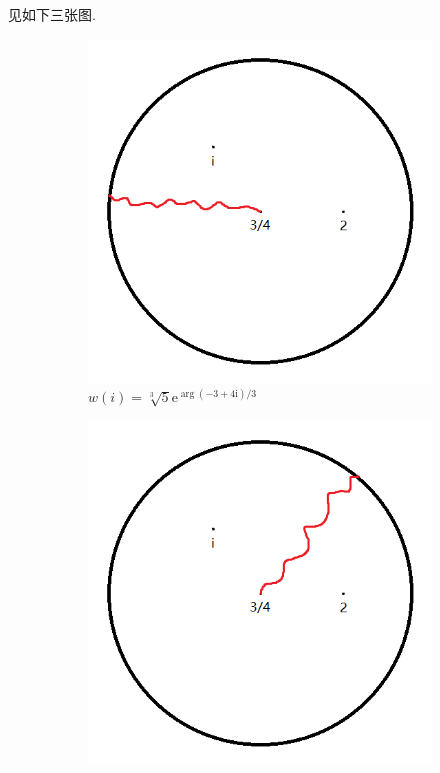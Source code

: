 \documentclass[a4paper,12pt]{ctexart}
\newcommand{\me}{\mathrm{e}}
\newcommand{\mi}{\mathrm{i}}
\begin{document}
    \begin{solution}
        见如下三张图.
        \begin{figure}[H]
            \begin{subfigure}{.49\textwidth}
                \centering
                \includegraphics[scale=0.5]{0.png}
                \caption{$\displaystyle w(i)=\sqrt[3]{5}\me^{\arg(-3+4\mi)/3}$}
                \label{figure_0}
            \end{subfigure}   
            \begin{subfigure}{.49\textwidth}
                \centering
                \includegraphics[scale=0.5]{-2pi.png}

\end{subfigure}
\end{figure}
\end{solution}
\end{document}

